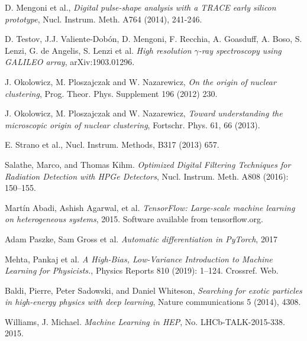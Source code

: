 \begin{thebibliography}{20}

  D. Mengoni et al.,
  \emph{Digital pulse-shape analysis with a TRACE early silicon prototype}, Nucl. Instrum. Meth. A764 (2014), 241-246.

  D. Testov, J.J. Valiente-Dobón, D. Mengoni, F. Recchia, A. Goasduff, A. Boso, S. Lenzi, G. de Angelis, S. Lenzi et al.
  \emph{High resolution $\gamma$-ray spectroscopy using GALILEO array}, arXiv:1903.01296.
  
  J. Okolowicz, M. Ploszajczak and W. Nazarewicz,
  \emph{On the origin of nuclear clustering}, Prog. Theor. Phys. Supplement 196 (2012) 230.

  J. Okolowicz, M. Ploszajczak and W. Nazarewicz,
  \emph{Toward understanding the microscopic origin of nuclear clustering}, Fortschr. Phys. 61, 66 (2013).

  E. Strano et al., Nucl. Instrum. Methods, B317 (2013) 657.
  

Salathe, Marco, and Thomas Kihm. 
\emph{Optimized Digital Filtering Techniques for Radiation Detection with HPGe Detectors}, Nucl. Instrum. Meth. A808 (2016): 150–155.

Martín Abadi, Ashish Agarwal, et al.
\emph{TensorFlow: Large-scale machine learning on heterogeneous systems},
2015. Software available from tensorflow.org.

Adam Paszke, Sam Gross et al.
\emph{Automatic differentiation in PyTorch},
2017

Mehta, Pankaj et al. 
\emph{A High-Bias, Low-Variance Introduction to Machine Learning for Physicists.}, Physics Reports 810 (2019): 1–124. Crossref. Web.

Baldi, Pierre, Peter Sadowski, and Daniel Whiteson, \emph{Searching for exotic particles in high-energy physics with deep learning}, Nature communications 5 (2014), 4308.

Williams, J. Michael. \emph{Machine Learning in HEP}, No. LHCb-TALK-2015-338. 2015.

\end{thebibliography}
